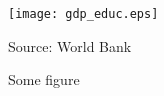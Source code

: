 \begin{figure}
\caption{Some figure\label{fig:gdp_educ}}

\begin{centering}
\medskip{}
\par\end{centering}
\begin{centering}
\texttt{[image: gdp\_educ.eps]}\medskip{}
\par\end{centering}
{\footnotesize{}Source: World Bank}{\footnotesize\par}
\end{figure}

